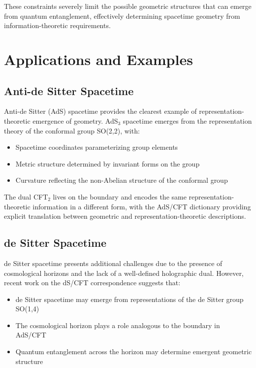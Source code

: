 \documentclass[12pt]{article}
\begin{document}
These constraints severely limit the possible geometric structures that can emerge from quantum entanglement, effectively determining spacetime geometry from information-theoretic requirements.

\section{Applications and Examples}

\subsection{Anti-de Sitter Spacetime}

Anti-de Sitter (AdS) spacetime provides the clearest example of representation-theoretic emergence of geometry. AdS$_3$ spacetime emerges from the representation theory of the conformal group SO(2,2), with:

\begin{itemize}
\item Spacetime coordinates parameterizing group elements
\item Metric structure determined by invariant forms on the group
\item Curvature reflecting the non-Abelian structure of the conformal group
\end{itemize}

The dual CFT$_2$ lives on the boundary and encodes the same representation-theoretic information in a different form, with the AdS/CFT dictionary providing explicit translation between geometric and representation-theoretic descriptions.

\subsection{de Sitter Spacetime}

de Sitter spacetime presents additional challenges due to the presence of cosmological horizons and the lack of a well-defined holographic dual. However, recent work on the dS/CFT correspondence suggests that:

\begin{itemize}
\item de Sitter spacetime may emerge from representations of the de Sitter group SO(1,4)
\item The cosmological horizon plays a role analogous to the boundary in AdS/CFT
\item Quantum entanglement across the horizon may determine emergent geometric structure
\end{itemize}
\end{document}
